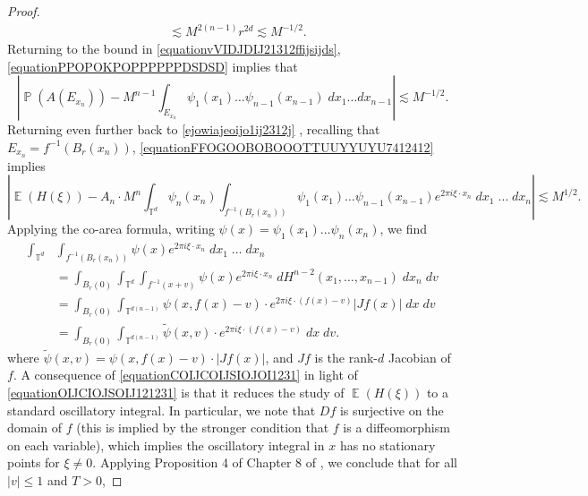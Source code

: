 \documentclass[dvipsnames,letterpaper,12pt]{article}
\numberwithin{equation}{section}
\DeclareMathOperator{\TT}{\mathbb{T}}
\numberwithin{theorem}{section}
\DeclareMathOperator{\EE}{\mathbb{E}}
\DeclareMathOperator{\PP}{\mathbb{P}}
\begin{document}
\begin{proof}
\begin{equation}
\begin{split}
        &\lesssim M^{2(n-1)} r^{2d} \lesssim M^{-1/2}.
    \end{split}
    \end{equation}
    Returning to the bound in \eqref{equationvVIDJDIJ21312ffijsijds}, \eqref{equationPPOPOKPOPPPPPPDSDSD} implies that
    \begin{equation} \label{equationFFOGOOBOBOOOTTUUYYUYU7412412}
        \left| \PP(A(E_{x_n})) - M^{n-1} \int_{E_{x_n}} \psi_1(x_1) \dots \psi_{n-1}(x_{n-1})\; dx_1 \dots dx_{n-1} \right| \lesssim M^{-1/2}.
    \end{equation}
    Returning even further back to \eqref{ejowiajeoijo1ij2312j}%
    , recalling that $E_{x_n} = f^{-1}(B_r(x_n))$, \eqref{equationFFOGOOBOBOOOTTUUYYUYU7412412} implies
    \begin{equation} \label{equationOIJCIOJSOIJ121231}
        \left| \EE(H(\xi)) - A_n \cdot M^n \int_{\TT^d} \psi_n(x_n) \int_{f^{-1}(B_r(x_n))} \psi_1(x_1) \dots \psi_{n-1}(x_{n-1}) e^{2 \pi i \xi \cdot x_n}\; dx_1\; \dots\; dx_n \right| \lesssim M^{1/2}.
    \end{equation}
    Applying the co-area formula, writing $\psi(x) = \psi_1(x_1) \dots \psi_n(x_n)$, we find
    \begin{equation} \label{equationCOIJCOIJSIOJOI1231}
    \begin{split}
        \int_{\TT^d} & \int_{f^{-1}(B_r(x_n))} \psi(x) e^{2 \pi i \xi \cdot x_n}\; dx_1\; \dots\; dx_n\\
        &= \int_{B_r(0)} \int_{\TT^d} \int_{f^{-1}(x + v)} \psi(x) e^{2 \pi i \xi \cdot x_n}\; dH^{n-2}(x_1,\dots,x_{n-1})\; dx_n\; dv\\
        &= \int_{B_r(0)} \int_{\TT^{d(n-1)}} \psi(x,f(x) - v) \cdot e^{2 \pi i \xi \cdot (f(x) - v)} |Jf(x)|\; dx\; dv\\
        &= \int_{B_r(0)} \int_{\TT^{d(n-1)}} \tilde{\psi}(x,v) \cdot e^{2 \pi i \xi \cdot (f(x) - v)}\; dx\; dv.
    \end{split}
    \end{equation}
    where $\tilde{\psi}(x,v) = \psi(x,f(x) - v) \cdot |Jf(x)|$, and $Jf$ is the rank-$d$ Jacobian of $f$. A consequence of \eqref{equationCOIJCOIJSIOJOI1231} in light of \eqref{equationOIJCIOJSOIJ121231} is that it reduces the study of $\EE(H(\xi))$ to a standard oscillatory integral. In particular, we note that $Df$ is surjective on the domain of $f$ (this is implied by the stronger condition that $f$ is a diffeomorphism on each variable), which implies the oscillatory integral in $x$ has no stationary points for $\xi \neq 0$. Applying Proposition 4 of Chapter 8 of \cite{Stein}, we conclude that for all $|v| \leq 1$ and $T > 0$,

\end{proof}
\end{document}
